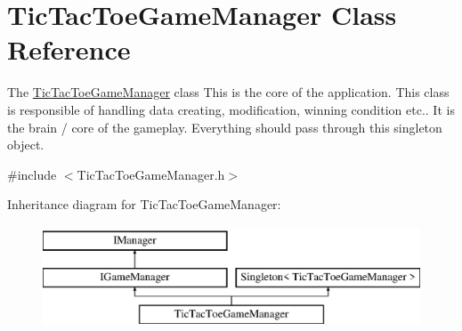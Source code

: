 \hypertarget{class_tic_tac_toe_game_manager}{}\section{Tic\+Tac\+Toe\+Game\+Manager Class Reference}
\label{class_tic_tac_toe_game_manager}


The \hyperlink{class_tic_tac_toe_game_manager}{Tic\+Tac\+Toe\+Game\+Manager} class This is the core of the application. This class is responsible of handling data creating, modification, winning condition etc.. It is the brain / core of the gameplay. Everything should pass through this singleton object.  




{\ttfamily \#include $<$Tic\+Tac\+Toe\+Game\+Manager.\+h$>$}

Inheritance diagram for Tic\+Tac\+Toe\+Game\+Manager\+:\begin{figure}[H]
\begin{center}
\leavevmode
\includegraphics[height=3.000000cm]{class_tic_tac_toe_game_manager}
\end{center}
\end{figure}
